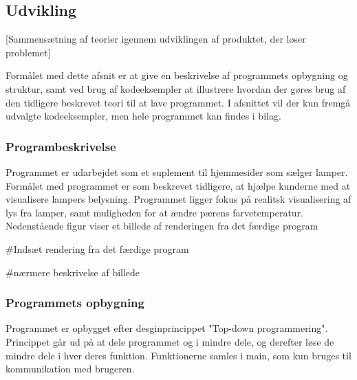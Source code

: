 \subsection{Udvikling}

[Sammensætning af teorier igennem udviklingen af produktet, der løser problemet]

Formålet med dette afsnit er at give en beskrivelse af programmets opbygning og struktur, samt ved brug af kodeeksempler at illustrere hvordan der gøres brug af den tidligere beskrevet teori til at lave programmet. I afsnittet vil der kun fremgå udvalgte kodeeksempler, men hele programmet kan findes i bilag. 

\subsubsection{Programbeskrivelse}

Programmet er udarbejdet som et suplement til hjemmesider som sælger lamper. Formålet med programmet er som beskrevet tidligere, at hjælpe kunderne med at visualisere lampers belysning. Programmet ligger fokus på realitsk visualisering af lys fra lamper, samt muligheden for at ændre pærens farvetemperatur.
Nedenstående figur viser et billede af renderingen fra det færdige program

\#Indsæt rendering fra det færdige program

\#nærmere beskrivelse af billede

\subsubsection{Programmets opbygning}

Programmet er opbygget efter desginprincippet "Top-down programmering". Princippet går ud på at dele programmet og i mindre dele, og derefter løse de mindre dele i hver deres funktion. Funktionerne samles i main, som kun bruges til kommunikation med brugeren. 

